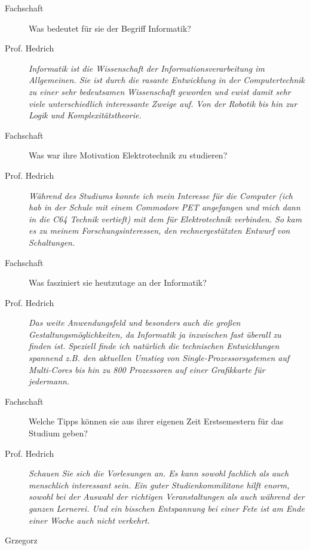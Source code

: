 \begin{description}

\item[Fachschaft] 

Was bedeutet für sie der Begriff Informatik?

\item[Prof. Hedrich]
 
\textit{Informatik ist die Wissenschaft der Informationsverarbeitung im Allgemeinen.
Sie ist durch die rasante Entwicklung in der Computertechnik zu einer sehr
bedeutsamen Wissenschaft geworden und ewist damit sehr viele unterschiedlich
interessante Zweige auf. Von der Robotik bis hin zur Logik und Komplexitätstheorie.}



\item[Fachschaft]

Was war ihre Motivation Elektrotechnik zu studieren?

\item[Prof. Hedrich]

\textit{Während des Studiums konnte ich mein Interesse für die Computer (ich hab
in der Schule mit einem Commodore PET angefangen und mich dann in
die C64 Technik vertieft) mit dem für Elektrotechnik verbinden.
So kam es zu meinem Forschungsinteressen, den rechnergestützten Entwurf von
Schaltungen.}

\item[Fachschaft]

Was fasziniert sie heutzutage an der Informatik?

\item[Prof. Hedrich]

\textit{Das weite Anwendungsfeld und besonders auch die großen
Gestaltungsmöglichkeiten, da Informatik ja inzwischen fast überall
zu finden ist. Speziell finde ich natürlich die technischen Entwicklungen
spannend z.B. den aktuellen Umstieg von Single-Prozessorsystemen auf
Multi-Cores bis hin zu 800 Prozessoren auf einer Grafikkarte für
jedermann.}

\item[Fachschaft]

Welche Tipps können sie aus ihrer eigenen Zeit Erstsemestern für das Studium geben?

\item[Prof. Hedrich]

\textit{Schauen Sie sich die Vorlesungen an. Es kann sowohl fachlich als auch
menschlich interessant sein. Ein guter Studienkommilitone hilft enorm,
sowohl bei der Auswahl der richtigen Veranstaltungen als auch während der
ganzen Lernerei. Und ein bisschen Entspannung bei einer Fete ist am Ende einer Woche
auch nicht verkehrt.}

\end{description}



\begin{flushright} Grzegorz \end{flushright}
